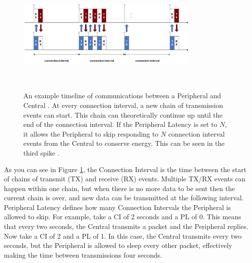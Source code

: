 \begin{figure}[]
    \centering
    \includegraphics[width=0.8\textwidth,height=6cm,keepaspectratio=true]{images/connection_interval_slave_latency}
    \caption{
        An example timeline of communications between a \color{red} Peripheral \color{black} and \color{blue} Central \color{black}. At every connection interval, a new chain of transmission events can start. This chain can theoretically continue up until the end of the connection interval. If the Peripheral Latency is set to $N$, it allows the Peripheral to skip responding to $N$ connection interval events from the Central to conserve energy. This can be seen in the third spike \cite{nordic_2022}.
    }
    \label{fig:ci_and_pl}
\end{figure}

As you can see in Figure \ref{fig:ci_and_pl}, the Connection Interval is the time between the start of chains of transmit (TX) and receive (RX) events. Multiple TX/RX events can happen within one chain, but when there is no more data to be sent then the current chain is over, and new data can be transmitted at the following interval. Peripheral Latency defines how many Connection Intervals the Peripheral is allowed to skip. For example, take a CI of 2 seconds and a PL of 0. This means that every two seconds, the Central transmits a packet and the Peripheral replies. Now take a CI of 2 and a PL of 1. In this case, the Central transmits every two seconds, but the Peripheral is allowed to sleep every other packet, effectively making the time between transmissions four seconds. 


